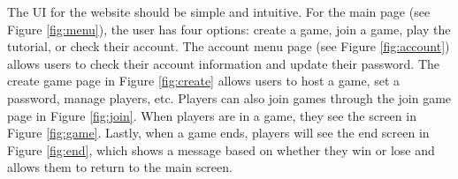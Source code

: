 \documentclass{article}
\begin{document}
The UI for the website should be simple and intuitive. For the main page (see Figure \ref{fig:menu}), the user has four options: create a game, join a game, play the tutorial, or check their account. The account menu page (see Figure \ref{fig:account}) allows users to check their account information and update their password. The create game page in Figure \ref{fig:create} allows users to host a game, set a password, manage players, etc. Players can also join games through the join game page in Figure \ref{fig:join}. When players are in a game, they see the screen in Figure \ref{fig:game}. Lastly, when a game ends, players will see the end screen in Figure \ref{fig:end}, which shows a message based on whether they win or lose and allows them to return to the main screen.
\end{document}
